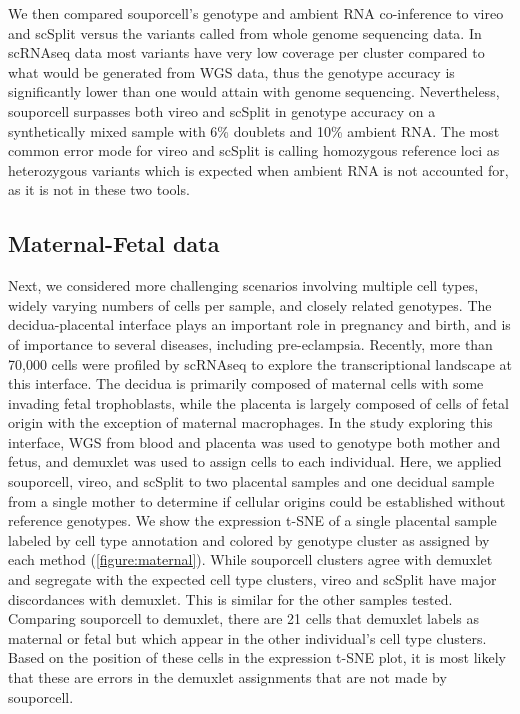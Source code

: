 \par{
We then compared souporcell's genotype and ambient RNA co-inference to vireo and scSplit versus the variants called from whole genome sequencing data. In scRNAseq data most variants have very low coverage per cluster compared to what would be generated from WGS data, thus the genotype accuracy is significantly lower than one would attain with genome sequencing. Nevertheless, souporcell surpasses both vireo and scSplit in genotype accuracy on a synthetically mixed sample with 6\% doublets and 10\% ambient RNA. The most common error mode for vireo and scSplit is calling homozygous reference loci as heterozygous variants  which is expected when ambient RNA is not accounted for, as it is not in these two tools.
}



\subsection{Maternal-Fetal data}

\par{
Next, we considered more challenging scenarios involving multiple cell types, widely varying numbers of cells per sample, and closely related genotypes. The decidua-placental interface plays an important role in pregnancy and birth, and is of importance to several diseases, including pre-eclampsia\cite{maternalfetal}. Recently, more than 70,000 cells were profiled by scRNAseq\cite{nkhla} to explore the transcriptional landscape at this interface. The decidua is primarily composed of maternal cells with some invading fetal trophoblasts, while the placenta is largely composed of cells of fetal origin with the exception of maternal macrophages. In the study exploring this interface\cite{maternalfetal}, WGS from blood and placenta was used to genotype both mother and fetus, and demuxlet was used to assign cells to each individual. Here, we applied souporcell, vireo, and scSplit to two placental samples and one decidual sample from a single mother to determine if cellular origins could be established without reference genotypes. We show the expression t-SNE of a single placental sample labeled by cell type annotation\cite{maternalfetal} and colored by genotype cluster as assigned by each method (\ref{figure:maternal}). While souporcell clusters agree with demuxlet and segregate with the expected cell type clusters, vireo and scSplit have major discordances with demuxlet. This is similar for the other samples tested. Comparing souporcell to demuxlet, there are 21 cells that demuxlet labels as maternal or fetal but which appear in the other individual's cell type clusters. Based on the position of these cells in the expression t-SNE plot, it is most likely that these are errors in the demuxlet assignments that are not made by souporcell. 
}


